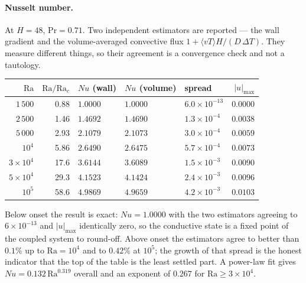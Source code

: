 \documentclass[11pt,a4paper]{article}
\newcommand{\e}[1]{\times 10^{#1}}
\begin{document}
\paragraph{Nusselt number.} At $H=48$, $\mathrm{Pr}=0.71$. Two independent
estimators are reported --- the wall gradient and the volume-averaged convective
flux $1+\langle vT\rangle H/(D\,\Delta T)$. They measure different things, so
their agreement is a convergence check and not a tautology.
\begin{center}\small
\begin{tabular}{rrlllr}
\toprule
$\mathrm{Ra}$ & $\mathrm{Ra}/\mathrm{Ra}_c$ & $Nu$ (wall) & $Nu$ (volume) & spread & $|u|_{\max}$ \\
\midrule
$1\,500$   & 0.88 & $1.0000$ & $1.0000$ & $6.0\e{-13}$ & $0.0000$ \\
$2\,500$   & 1.46 & $1.4692$ & $1.4690$ & $1.3\e{-4}$  & $0.0038$ \\
$5\,000$   & 2.93 & $2.1079$ & $2.1073$ & $3.0\e{-4}$  & $0.0059$ \\
$10^{4}$   & 5.86 & $2.6490$ & $2.6475$ & $5.7\e{-4}$  & $0.0073$ \\
$3\times10^{4}$ & 17.6 & $3.6144$ & $3.6089$ & $1.5\e{-3}$ & $0.0090$ \\
$5\times10^{4}$ & 29.3 & $4.1523$ & $4.1424$ & $2.4\e{-3}$ & $0.0096$ \\
$10^{5}$   & 58.6 & $4.9869$ & $4.9659$ & $4.2\e{-3}$  & $0.0103$ \\
\bottomrule
\end{tabular}
\end{center}
\noindent Below onset the result is exact: $Nu = 1.0000$ with the two estimators
agreeing to $6\e{-13}$ and $|u|_{\max}$ identically zero, so the conductive state
is a fixed point of the coupled system to round-off. Above onset the estimators
agree to better than $0.1\%$ up to $\mathrm{Ra}=10^4$ and to $0.42\%$ at
$10^5$; the growth of that spread is the honest indicator that the top of the
table is the least settled part. A power-law fit gives
$Nu = 0.132\,\mathrm{Ra}^{0.319}$ overall and an exponent of $0.267$ for
$\mathrm{Ra}\ge3\times10^4$.
\end{document}

